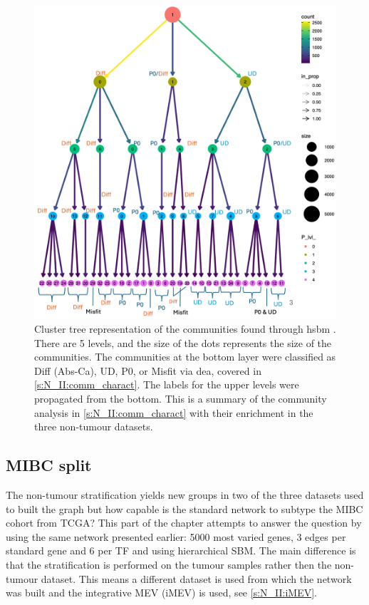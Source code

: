 \begin{figure}[H]    
    \centering
    \includegraphics[width=1.0\textwidth,keepaspectratio]{Sections/Network_II/resources/non_tum/clustertree_labels.png}
    \caption[Cluster tree: non-tumour and bladder differentiation]{Cluster tree representation of the communities found through \acrshort{hsbm} \citep{Peixoto2014-yb}. There are 5 levels, and the size of the dots represents the size of the communities. The communities at the bottom layer were classified as Diff (Abs-Ca), UD, P0, or Misfit via \acrfull{dea}, covered in \cref{s:N_II:comm_charact}. The labels for the upper levels were propagated from the bottom. This is a summary of the community analysis in \cref{s:N_II:comm_charact} with their enrichment in the three non-tumour datasets.}
    \label{fig:N_II:cluster_tree}
\end{figure}



% 
\subsection{MIBC split} \label{s:N_II:tum_split}

The non-tumour stratification yields new groups in two of the three datasets used to built the graph but how capable is the standard network to subtype the MIBC cohort from TCGA? This part of the chapter attempts to answer the question by using the same network presented earlier: 5000 most varied genes, 3 edges per standard gene and 6 per TF and using hierarchical SBM. The main difference is that the stratification is performed on the tumour samples rather then the non-tumour dataset. This means a different dataset is used from which the network was built and the integrative MEV (iMEV) is used, see \cref{s:N_II:iMEV}.

